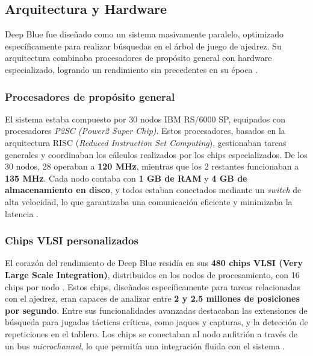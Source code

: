 \documentclass[12pt,a4paper]{article}
\begin{document}
\subsection{Arquitectura y Hardware}
Deep Blue fue diseñado como un sistema masivamente paralelo, optimizado específicamente para realizar búsquedas en el árbol de juego de ajedrez. Su arquitectura combinaba procesadores de propósito general con hardware especializado, logrando un rendimiento sin precedentes en su época \cite{campbell2002deepblue}.

\subsubsection*{Procesadores de propósito general}
El sistema estaba compuesto por 30 nodos IBM RS/6000 SP, equipados con procesadores \textit{P2SC (Power2 Super Chip)}. Estos procesadores, basados en la arquitectura RISC (\textit{Reduced Instruction Set Computing}), gestionaban tareas generales y coordinaban los cálculos realizados por los chips especializados. De los 30 nodos, 28 operaban a \textbf{120 MHz}, mientras que los 2 restantes funcionaban a \textbf{135 MHz}. Cada nodo contaba con \textbf{1 GB de RAM} y \textbf{4 GB de almacenamiento en disco}, y todos estaban conectados mediante un \textit{switch} de alta velocidad, lo que garantizaba una comunicación eficiente y minimizaba la latencia \cite{campbell2002deepblue}. 

\subsubsection*{Chips VLSI personalizados}
El corazón del rendimiento de Deep Blue residía en sus \textbf{480 chips VLSI (Very Large Scale Integration)}, distribuidos en los nodos de procesamiento, con 16 chips por nodo \cite{gropp1999using}. Estos chips, diseñados específicamente para tareas relacionadas con el ajedrez, eran capaces de analizar entre \textbf{2 y 2.5 millones de posiciones por segundo}. Entre sus funcionalidades avanzadas destacaban las extensiones de búsqueda para jugadas tácticas críticas, como jaques y capturas, y la detección de repeticiones en el tablero. Los chips se conectaban al nodo anfitrión a través de un bus \textit{microchannel}, lo que permitía una integración fluida con el sistema \cite{campbell2002deepblue}.
\end{document}
